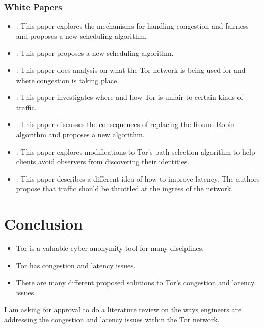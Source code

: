 \documentclass[letterpaper,13pt]{texMemo}
\begin{document}
\subsubsection*{White Papers}
\begin{itemize}
    \item
    \citeauthor*{unfair}: This paper explores the mechanisms for handling congestion
    and fairness and proposes a new scheduling algorithm.
    \item
    \citeauthor*{Tang}: This paper proposes a new scheduling algorithm.
    \item
    \citeauthor*{analysis}: This paper does analysis on what the Tor network is being used for and where congestion is taking place.
    \item
    \citeauthor*{delay}: This paper investigates where and how Tor is unfair to certain kinds of traffic.
    \item
    \citeauthor*{Bauer}: This paper discusses the consequences of replacing the Round Robin algorithm and
    proposes a new algorithm.
    \item
    \citeauthor*{Edman}: This paper explores modifications to Tor's path selection algorithm to help
    clients avoid observers from discovering their identities.
    \item
    \citeauthor*{Moore}: This paper describes a different idea of how to improve latency. The
    authors propose that traffic should be throttled at the ingress of the network.

\end{itemize}


\section*{Conclusion}
\begin{itemize}
    \item
    Tor is a valuable cyber anonymity tool for many disciplines.
    \item
    Tor has congestion and latency issues.
    \item
    There are many different proposed solutions to Tor's congestion and latency issues.
\end{itemize}
I am asking for approval to do a literature review on the ways engineers are addressing the
congestion and latency issues within the Tor network.



\end{document}
